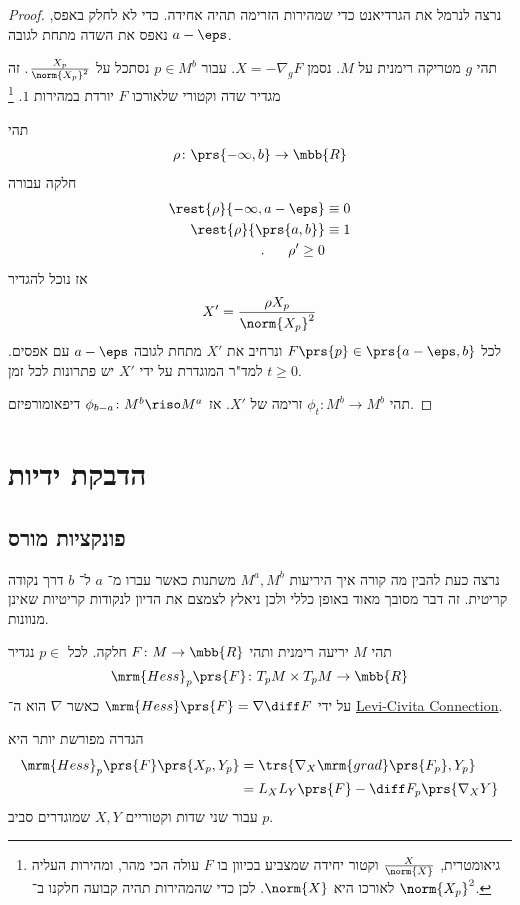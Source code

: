 \documentclass[a4paper,10pt,twoside,openany]{book}
\begin{document}
\begin{proof}
נרצה לנרמל את הגרדיאנט כדי שמהירות הזרימה תהיה אחידה. כדי לא לחלק באפס, נאפס את השדה מתחת לגובה
$a-\eps$.

תהי
$g$
מטריקה רימנית על
$M$.
נסמן
$X = -\nabla_g F$.
עבור
$p \in M^b$
נסתכל על
$\frac{X_p}{\norm{X_p}^2}$.
זה מגדיר שדה וקטורי שלאורכו
$F$
יורדת במהירות
$1$.%
\footnote{
גיאומטרית,
$\frac{X}{\norm{X}}$
וקטור יחידה שמצביע בכיוון בו
$F$
עולה הכי מהר, ומהירות העליה לאורכו היא
$\norm{X}$. לכן כדי שהמהירות תהיה קבועה חלקנו ב־%
$\norm{X_p}^2$.}

תהי
\begin{align*}
\rho \colon \prs{-\infty, b} \to \mbb{R}
\end{align*}
חלקה עבורה
\begin{align*}
\rest{\rho}{-\infty, a-\eps} &\equiv 0 \\
\rest{\rho}{\prs{a,b}} &\equiv 1 \\
\text{.} \hphantom{lala} \rho' \geq 0
\end{align*}
אז נוכל להגדיר
\[X' = \frac{\rho X_p}{\norm{X_p}^2}\]
לכל
$F\prs{p} \in \prs{a-\eps, b}$
ונרחיב את
$X'$
מתחת לגובה
$a-\eps$
עם אפסים.
למד"ר המוגדרת על ידי
$X'$
יש פתרונות לכל זמן
$t \geq 0$.

תהי
$\phi_t \colon M^b \to M^b$
זרימה של
$X'$.
אז
$\phi_{b-a} \colon M^b \riso M^a$
דיפאומורפיזם.
\end{proof}

\section{הדבקת ידיות}

\subsection{פונקציות מורס}

נרצה כעת להבין מה קורה איך היריעות
$M^a, M^b$
משתנות כאשר עברו מ־%
$a$
ל־%
$b$
דרך נקודה קריטית.
זה דבר מסובך מאוד באופן כללי ולכן ניאלץ לצמצם את הדיון לנקודות קריטיות שאינן מנוונות.

\begin{definition}[הסיאן]
תהי
$M$
יריעה רימנית ותהי
$F \colon M \to \mbb{R}$
חלקה.
לכל
$p \in $
נגדיר
\[\mrm{Hess}_p\prs{F} \colon T_p M \times T_p M \to \mbb{R}\]
על ידי
$\mrm{Hess}\prs{F} = \nabla \diff F$
כאשר
$\nabla$
הוא ה־%
\href{https://en.wikipedia.org/wiki/Levi-Civita_connection}{\textenglish{Levi-Civita Connection}}.

הגדרה מפורשת יותר היא
\begin{align*}
\mrm{Hess}_p\prs{F} \prs{X_p,Y_p} &= \trs{\nabla_X \mrm{grad}\prs{F_p}, Y_p}
\\&= L_X L_Y \prs{F} - \diff F_p\prs{\nabla_X Y}
\end{align*}
עבור שני שדות וקטוריים
$X,Y$
שמוגדרים סביב
$p$.
\end{definition}
\end{document}
